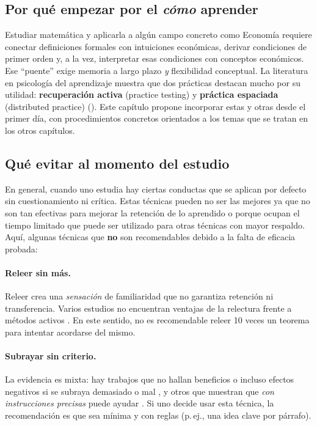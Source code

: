 \documentclass{article}
\begin{document}
\subsection*{Por qué empezar por el \emph{cómo} aprender}
Estudiar matemática y aplicarla a algún campo concreto como Economía requiere conectar definiciones formales con intuiciones económicas, derivar condiciones de primer orden y, a la vez, interpretar esas condiciones con conceptos económicos. Ese “puente” exige memoria a largo plazo \emph{y} flexibilidad conceptual. La literatura en psicología del aprendizaje muestra que dos prácticas destacan mucho por su utilidad: \textbf{\color{teal}recuperación activa} (practice testing) y \textbf{\color{teal}práctica espaciada} (distributed practice) (\cite{Dunlosky2013,RoedigerButler2011,Cepeda2006,Cepeda2008}). Este capítulo propone incorporar estas y otras desde el primer día, con procedimientos concretos orientados a los temas que se tratan en los otros capítulos.

\subsection*{Qué evitar al momento del estudio}
En general, cuando uno estudia hay ciertas conductas que se aplican por defecto sin cuestionamiento ni crítica. Estas técnicas pueden no ser las mejores ya que no son tan efectivas para mejorar la retención de lo aprendido o porque ocupan el tiempo limitado que puede ser utilizado para otras técnicas con mayor respaldo. Aquí, algunas técnicas que \textbf{no} son recomendables debido a la falta de eficacia probada:


\paragraph{\color{teal}Releer sin más.} Releer crea una \emph{sensación} de familiaridad que no garantiza retención ni transferencia. Varios estudios no encuentran ventajas de la relectura frente a métodos activos \cite{CallenderMcDaniel2009,Weinstein2010,Agarwal2008}. En este sentido, no es recomendable releer 10 veces un teorema para intentar acordarse del mismo.

\paragraph{\color{teal}Subrayar sin criterio.} La evidencia es mixta: hay trabajos que no hallan beneficios o incluso efectos negativos si se subraya demasiado o mal \cite{Peterson1991,LorchKlusewitz1995,Winchell2018}, y otros que muestran que \emph{con instrucciones precisas} puede ayudar \cite{Yue2015,Miyatsu2018}. Si uno decide usar esta técnica, la recomendación es que sea mínima y con reglas (p.\,ej., una idea clave por párrafo).
\end{document}
